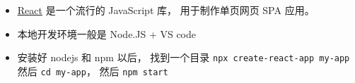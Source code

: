 
\begin{issues}
\issueDraft
\end{issues}


\begin{itemize}
\item \href{https://react.dev/}{React} 是一个流行的 JavaScript 库， 用于制作单页网页 SPA 应用。
\item 本地开发环境一般是 Node.JS + VS code
\item 安装好 nodejs 和 npm 以后， 找到一个目录 \verb`npx create-react-app my-app` 然后 \verb`cd my-app`， 然后 \verb`npm start`
\end{itemize}
